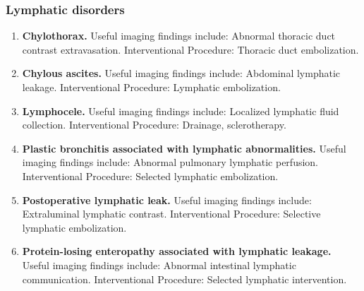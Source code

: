 \subsubsection{Lymphatic disorders}
\begin{enumerate}[leftmargin=*,itemsep=0.45em,topsep=0.4em]
\item \textbf{Chylothorax.} Useful imaging findings include: Abnormal thoracic duct contrast extravasation. Interventional Procedure: Thoracic duct embolization.
\item \textbf{Chylous ascites.} Useful imaging findings include: Abdominal lymphatic leakage. Interventional Procedure: Lymphatic embolization.
\item \textbf{Lymphocele.} Useful imaging findings include: Localized lymphatic fluid collection. Interventional Procedure: Drainage, sclerotherapy.
\item \textbf{Plastic bronchitis associated with lymphatic abnormalities.} Useful imaging findings include: Abnormal pulmonary lymphatic perfusion. Interventional Procedure: Selected lymphatic embolization.
\item \textbf{Postoperative lymphatic leak.} Useful imaging findings include: Extraluminal lymphatic contrast. Interventional Procedure: Selective lymphatic embolization.
\item \textbf{Protein-losing enteropathy associated with lymphatic leakage.} Useful imaging findings include: Abnormal intestinal lymphatic communication. Interventional Procedure: Selected lymphatic intervention.
\end{enumerate}

